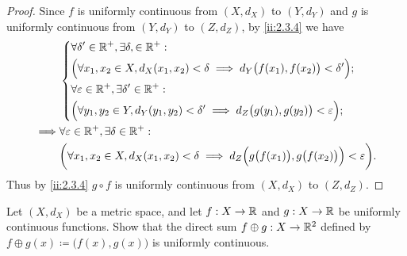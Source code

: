 \begin{proof}
  Since \(f\) is uniformly continuous from \((X, d_X)\) to \((Y, d_Y)\) and \(g\) is uniformly continuous from \((Y, d_Y)\) to \((Z, d_Z)\), by \cref{ii:2.3.4} we have
  \begin{align*}
             & \begin{dcases}
                 \forall \delta' \in \mathbb{R}^+, \exists \delta, \in \mathbb{R}^+ :                                                     \\
                 \Big(\forall x_1, x_2 \in X, d_X(x_1, x_2) < \delta \implies d_Y\big(f(x_1), f(x_2)\big) < \delta'\Big); \\
                 \forall \varepsilon \in \mathbb{R}^+, \exists \delta' \in \mathbb{R}^+ :                                                 \\
                 \Big(\forall y_1, y_2 \in Y, d_Y(y_1, y_2) < \delta' \implies d_Z\big(g(y_1), g(y_2)\big) < \varepsilon\Big);
               \end{dcases}                         \\
    \implies & \forall \varepsilon \in \mathbb{R}^+, \exists \delta \in \mathbb{R}^+ :                                                                              \\
             & \bigg(\forall x_1, x_2 \in X, d_X(x_1, x_2) < \delta \implies d_Z\Big(g\big(f(x_1)\big), g\big(f(x_2)\big)\Big) < \varepsilon\bigg).
  \end{align*}
  Thus by \cref{ii:2.3.4} \(g \circ f\) is uniformly continuous from \((X, d_X)\) to \((Z, d_Z)\).
\end{proof}

\begin{ex}\label{ii:ex:2.3.5}
  Let \((X, d_X)\) be a metric space, and let \(f : X \to \mathbb{R}\) and \(g : X \to \mathbb{R}\) be uniformly continuous functions.
  Show that the direct sum \(f \oplus g : X \to \mathbb{R}^2\) defined by \(f \oplus g(x) \coloneqq \big(f(x), g(x)\big)\) is uniformly continuous.
\end{ex}

